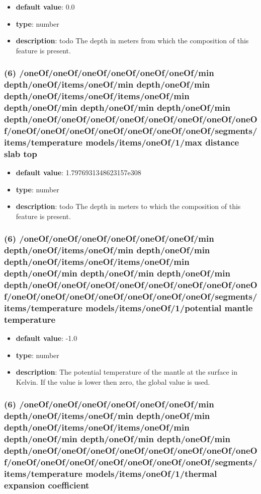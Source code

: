 \begin{itemize}[leftmargin=6em]\item {\bf default value}: 0.0
\item {\bf type}: number
\item {\bf description}: todo The depth in meters from which the composition of this feature is present.
\end{itemize}\subsubsection{(6) /oneOf/oneOf/oneOf/oneOf/oneOf/oneOf/min depth/oneOf/items/oneOf/min depth/oneOf/min depth/oneOf/items/oneOf/items/oneOf/min depth/oneOf/min depth/oneOf/min depth/oneOf/min depth/oneOf/oneOf/oneOf/oneOf/oneOf/oneOf/oneOf/oneOf/oneOf/oneOf/oneOf/oneOf/oneOf/oneOf/oneOf/segments/items/temperature models/items/oneOf/1/max distance slab top}
\begin{itemize}[leftmargin=6em]\item {\bf default value}: 1.7976931348623157e308
\item {\bf type}: number
\item {\bf description}: todo The depth in meters to which the composition of this feature is present.
\end{itemize}\subsubsection{(6) /oneOf/oneOf/oneOf/oneOf/oneOf/oneOf/min depth/oneOf/items/oneOf/min depth/oneOf/min depth/oneOf/items/oneOf/items/oneOf/min depth/oneOf/min depth/oneOf/min depth/oneOf/min depth/oneOf/oneOf/oneOf/oneOf/oneOf/oneOf/oneOf/oneOf/oneOf/oneOf/oneOf/oneOf/oneOf/oneOf/oneOf/segments/items/temperature models/items/oneOf/1/potential mantle temperature}
\begin{itemize}[leftmargin=6em]\item {\bf default value}: -1.0
\item {\bf type}: number
\item {\bf description}: The potential temperature of the mantle at the surface in Kelvin. If the value is lower then zero, the global value is used.
\end{itemize}\subsubsection{(6) /oneOf/oneOf/oneOf/oneOf/oneOf/oneOf/min depth/oneOf/items/oneOf/min depth/oneOf/min depth/oneOf/items/oneOf/items/oneOf/min depth/oneOf/min depth/oneOf/min depth/oneOf/min depth/oneOf/oneOf/oneOf/oneOf/oneOf/oneOf/oneOf/oneOf/oneOf/oneOf/oneOf/oneOf/oneOf/oneOf/oneOf/segments/items/temperature models/items/oneOf/1/thermal expansion coefficient}
